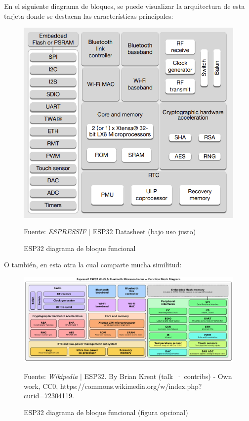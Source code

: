 \documentclass[conference]{IEEEtran}
\begin{document}
    \bigbreak

    En el siguiente diagrama de bloques, se puede visualizar la arquitectura
    de esta tarjeta donde se destacan las características principales:

    \begin{figure}[H]
        \centering
        \includegraphics[width=0.3\paperwidth]{images/esp32-functional-block-diagram}
        \caption{ESP32 diagrama de bloque funcional} \footnotesize
        Fuente: \textit{ESPRESSIF} $\mid$ ESP32 Datasheet \cite{espressif-systems-shanghai-co-ltd-2022B} (bajo uso justo)
    \end{figure}

    O también, en esta otra la cual comparte mucha similitud:

    \begin{figure}[H]
        \centering
        \includegraphics[width=0.3\paperwidth]{images/espressif-esp32-chip-function-block-diagram}
        \caption{ESP32 diagrama de bloque funcional (figura opcional)} \footnotesize
        Fuente: \textit{Wikipedia} $\mid$ ESP32. By Brian Krent (talk · contribs) - Own work, CC0, https://commons.wikimedia.org/w/index.php?curid=72304119.
\end{figure}
\end{document}
